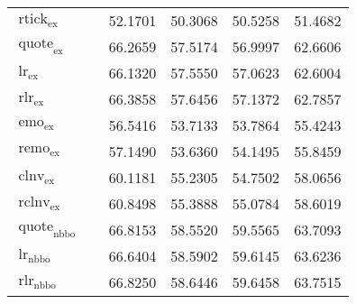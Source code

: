 \begin{table}[H]
\begin{tabular}{@{}p{5.7cm}lSSSS@{}}
        $\operatorname{rtick}_{\mathrm{ex}}$                                                                                  &                  & 52.1701                            & 50.3068 & 50.5258 & 51.4682 \\
        $\operatorname{quote}_{\mathrm{ex}}$                                                                                  &                  & 66.2659                            & 57.5174 & 56.9997 & 62.6606 \\
        $\operatorname{lr}_{\mathrm{ex}}$                                                                                     &                  & 66.1320                            & 57.5550 & 57.0623 & 62.6004 \\
        $\operatorname{rlr}_{\mathrm{ex}}$                                                                                    &                  & 66.3858                            & 57.6456 & 57.1372 & 62.7857 \\
        $\operatorname{emo}_{\mathrm{ex}}$                                                                                    &                  & 56.5416                            & 53.7133 & 53.7864 & 55.4243 \\
        $\operatorname{remo}_{\mathrm{ex}}$                                                                                   &                  & 57.1490                            & 53.6360 & 54.1495 & 55.8459 \\
        $\operatorname{clnv}_{\mathrm{ex}}$                                                                                   &                  & 60.1181                            & 55.2305 & 54.7502 & 58.0656 \\
        $\operatorname{rclnv}_{\mathrm{ex}}$                                                                                  &                  & 60.8498                            & 55.3888 & 55.0784 & 58.6019 \\ \midrule
        $\operatorname{quote}_{\mathrm{nbbo}}$                                                                                &                  & 66.8153                            & 58.5520 & 59.5565 & 63.7093 \\
        $\operatorname{lr}_{\mathrm{nbbo}}$                                                                                   &                  & 66.6404                            & 58.5902 & 59.6145 & 63.6236 \\
        $\operatorname{rlr}_{\mathrm{nbbo}}$                                                                                  &                  & 66.8250                            & 58.6446 & 59.6458 & 63.7515 \\

\end{tabular}
\end{table}
